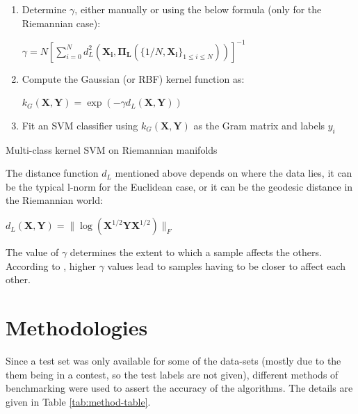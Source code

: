 \documentclass[12pt]{article}
\begin{document}
\begin{sloppypar}
\begin{algorithm}[H]
    \begin{enumerate}
        \item Determine $\gamma$, either manually or using the below formula (only for the Riemannian case):
            \begin{center}
                $\gamma = N [{\sum_{i=0}^{N} d^{2}_{L}(\bm{X_{i}, \Pi_{L}}(\{1/N, \bm{X_{i}}\}_{1 \leq i \leq N}))}]^{-1}$
            \end{center}
        \item Compute the Gaussian (or RBF) kernel function as:
            \begin{center}
                $k_{G}(\bm{X, Y}) = \exp(-\gamma d_{L}(\bm{X, Y}))$
            \end{center}
        \item Fit an SVM classifier using $k_{G}(\bm{X, Y})$ as the Gram matrix and labels $y_{i}$
    \end{enumerate}
    \caption{Multi-class kernel SVM on Riemannian manifolds}
\end{algorithm}
\vspace{5mm}
\noindent
The distance function $d_{L}$ mentioned above depends on where the data lies, it can be the typical l-norm for the Euclidean case, or it can be the geodesic distance in the Riemannian world:
\begin{center}
    $d_{L}(\bm{X, Y}) = \|\log(\bm{X}^{1/2}\bm{YX}^{1/2})\|_{F}$
\end{center}
The value of $\gamma$ determines the extent to which a sample affects the others. According to \cite{sklearn_api}, higher $\gamma$ values lead to samples having to be closer to affect each other.

\section{Methodologies}
Since a test set was only available for some of the data-sets (mostly due to the them being in a contest, so the test labels are not given), different methods of benchmarking were used to assert the accuracy of the algorithms. The details are given in Table \ref{tab:method-table}.


\end{sloppypar}
\end{document}
